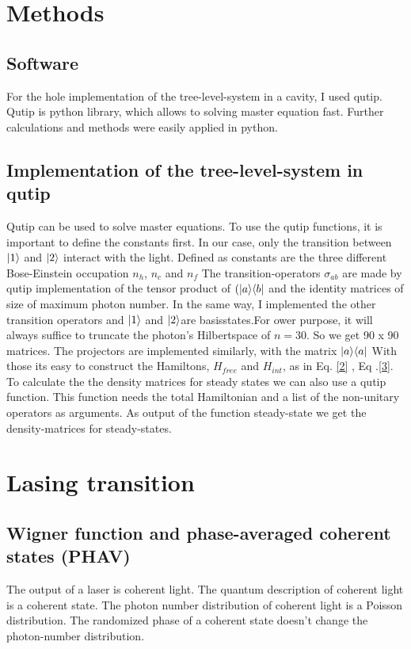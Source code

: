 \documentclass[12pt,a4paper]{article}
\DeclarePairedDelimiter\bra{\langle}{\rvert}
\DeclarePairedDelimiter\ket{\lvert}{\rangle}
\begin{document}
\section{Methods}
\subsection{Software}
For the hole implementation of the tree-level-system in a cavity, I used qutip. Qutip is python library, which allows to solving master equation fast.
Further calculations and methods were easily applied in python. 
\subsection{Implementation of the tree-level-system in qutip}
Qutip can be used to solve master equations. To use the qutip functions, it is important to define the constants first.  
In our case, only the transition between $\ket{1}$ and $\ket{2}$ interact with the light. 
Defined as constants are the three different Bose-Einstein occupation $n_h$, $n_c$ and $n_f$
The transition-operators $\sigma_{ab}$ are  made by qutip implementation of the tensor product of $(\ket{a}\bra{b}$ and the identity matrices of size of maximum photon number. 
In the same way, I implemented the other transition operators and 
$\ket{1}$ and $\ket{2}$are basisstates.For ower purpose, it will  always suffice to truncate the photon's Hilbertspace of $n=30$. So we get  90 x 90 matrices. 
The projectors are implemented similarly, with the matrix $\ket{a}\bra{a}$
With those its easy to construct the Hamiltons, $H_{free}$ and $H_{int}$, as in Eq. \eqref{2} , Eq .\eqref{3}.
To calculate the the density matrices for steady states we can also use a qutip function.
This function needs the total Hamiltonian and a list of the non-unitary operators as arguments.
As output of the function steady-state we get the density-matrices for steady-states. \cite{Nation2022}
\section{Lasing transition}

\subsection{Wigner function and phase-averaged coherent states (PHAV)}
The output of a laser is coherent light.
The quantum description of coherent light is a coherent state. The photon number distribution of coherent light is a Poisson distribution. The randomized phase of a coherent state doesn't change the photon-number distribution. \\
\end{document}
